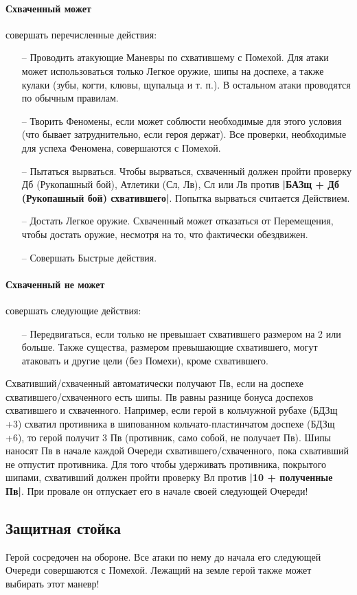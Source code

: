 \paragraph{Схваченный может} совершать перечисленные действия:
\begin{itemize}
\item[--] Проводить атакующие Маневры по схватившему с Помехой. Для атаки может использоваться только Легкое оружие, шипы на доспехе, а также кулаки (зубы, когти, клювы, щупальца и т. п.). В остальном атаки проводятся по обычным правилам.
\item[--] Творить Феномены, если может соблюсти необходимые для этого условия (что бывает затруднительно, если героя держат). Все проверки, необходимые для успеха Феномена, совершаются с Помехой.
\item[--] Пытаться вырваться. Чтобы вырваться, схваченный должен пройти проверку Дб (Рукопашный бой), Атлетики (Сл, Лв), Сл или Лв против \textbf{|БАЗщ + Дб (Рукопашный бой) схватившего|}. Попытка вырваться считается Действием.
\item[--] Достать Легкое оружие. Схваченный может отказаться от Перемещения, чтобы достать оружие, несмотря на то, что фактически обездвижен.
\item[--] Совершать Быстрые действия.
\end{itemize}
\paragraph{Схваченный не может} совершать следующие действия:
\begin{itemize}
\item[--] Передвигаться, если только не превышает схватившего размером на 2 или больше. Также существа, размером превышающие схватившего, могут атаковать и другие цели (без Помехи), кроме схватившего. 
\end{itemize}
Схвативший/схваченный автоматически получают Пв, если на доспехе схватившего/схваченного есть шипы. Пв равны разнице бонуса доспехов схватившего и схваченного. Например, если герой в кольчужной рубахе (БДЗщ +3) схватил противника в шипованном кольчато-пластинчатом доспехе (БДЗщ +6), то герой получит 3 Пв (противник, само собой, не получает Пв). Шипы наносят Пв в начале каждой Очереди схватившего/схваченного, пока схвативший не отпустит противника. Для того чтобы удерживать противника, покрытого шипами, схвативший должен пройти проверку Вл против \textbf{|10 + полученные Пв|}. При провале он отпускает его в начале своей следующей Очереди!
\subsection{Защитная стойка}
Герой сосредочен на обороне. Все атаки по нему до начала его следующей Очереди совершаются с Помехой. Лежащий на земле герой также может выбирать этот маневр!
